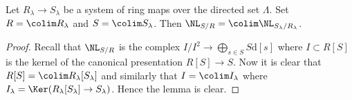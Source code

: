 \begin{lemma}
\label{lemma-colimits-NL}
Let $R_\lambda \to S_\lambda$ be a system of ring maps over
the directed set $\Lambda$.
Set $R = \colim R_\lambda$ and $S = \colim S_\lambda$.
Then $\NL_{S/R} = \colim \NL_{S_\lambda/R_\lambda}$.
\end{lemma}

\begin{proof}
Recall that $\NL_{S/R}$ is the complex
$I/I^2 \to \bigoplus_{s \in S} S\text{d}[s]$ where $I \subset R[S]$
is the kernel of the canonical presentation $R[S] \to S$.
Now it is clear that $R[S] = \colim R_\lambda[S_\lambda]$ and similarly
that $I = \colim I_\lambda$ where
$I_\lambda = \Ker(R_\lambda[S_\lambda] \to S_\lambda)$.
Hence the lemma is clear.
\end{proof}
